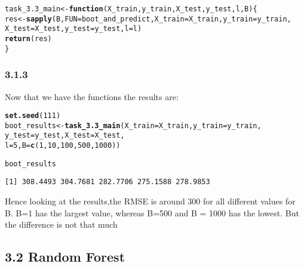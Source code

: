 \documentclass[10pt, a4paper, english]{article}\usepackage[]{graphicx}\usepackage[dvipsnames]{xcolor}
\makeatletter
\newcommand{\hlnum}[1]{\textcolor[rgb]{0.686,0.059,0.569}{#1}}%
\newcommand{\hlstd}[1]{\textcolor[rgb]{0.345,0.345,0.345}{#1}}%
\newcommand{\hlkwa}[1]{\textcolor[rgb]{0.161,0.373,0.58}{\textbf{#1}}}%
\newcommand{\hlkwb}[1]{\textcolor[rgb]{0.69,0.353,0.396}{#1}}%
\newcommand{\hlkwc}[1]{\textcolor[rgb]{0.333,0.667,0.333}{#1}}%
\newcommand{\hlkwd}[1]{\textcolor[rgb]{0.737,0.353,0.396}{\textbf{#1}}}%
\newenvironment{kframe}{%
 \def\at@end@of@kframe{}%
 \ifinner\ifhmode%
  \def\at@end@of@kframe{\end{minipage}}%
  \begin{minipage}{\columnwidth}%
 \fi\fi%
 \def\FrameCommand##1{\hskip\@totalleftmargin \hskip-\fboxsep
 \colorbox{shadecolor}{##1}\hskip-\fboxsep
     \hskip-\linewidth \hskip-\@totalleftmargin \hskip\columnwidth}%
 \MakeFramed {\advance\hsize-\width
   \@totalleftmargin\z@ \linewidth\hsize
   \@setminipage}}%
 {\par\unskip\endMakeFramed%
 \at@end@of@kframe}
\newenvironment{knitrout}{}{} %
\makeatother
\begin{document}
\begin{knitrout}
\begin{kframe}
\begin{alltt}
\hlstd{task_3.3_main} \hlkwb{<-} \hlkwa{function}\hlstd{(}\hlkwc{X_train}\hlstd{,} \hlkwc{y_train}\hlstd{,} \hlkwc{X_test}\hlstd{,} \hlkwc{y_test}\hlstd{,} \hlkwc{l}\hlstd{,} \hlkwc{B}\hlstd{)\{}
  \hlstd{res}\hlkwb{<-} \hlkwd{sapply}\hlstd{(B,} \hlkwc{FUN} \hlstd{= boot_and_predict,} \hlkwc{X_train}\hlstd{=X_train,} \hlkwc{y_train} \hlstd{= y_train,}
               \hlkwc{X_test} \hlstd{= X_test,} \hlkwc{y_test} \hlstd{= y_test,} \hlkwc{l}\hlstd{= l)}
  \hlkwd{return}\hlstd{(res)}
\hlstd{\}}
\end{alltt}
\end{kframe}
\end{knitrout}

\subsubsection{3.1.3}
Now that we have the functions  the results are: 
\begin{knitrout}
\color{fgcolor}\begin{kframe}
\begin{alltt}
\hlkwd{set.seed}\hlstd{(}\hlnum{111}\hlstd{)}
\hlstd{boot_results} \hlkwb{<-} \hlkwd{task_3.3_main}\hlstd{(}\hlkwc{X_train} \hlstd{= X_train,} \hlkwc{y_train} \hlstd{=  y_train,}
                              \hlkwc{y_test} \hlstd{= y_test,} \hlkwc{X_test} \hlstd{= X_test,}
              \hlkwc{l}\hlstd{=} \hlnum{5}\hlstd{,} \hlkwc{B}\hlstd{=} \hlkwd{c}\hlstd{(}\hlnum{1}\hlstd{,}\hlnum{10}\hlstd{,} \hlnum{100}\hlstd{,}\hlnum{500}\hlstd{,} \hlnum{1000}\hlstd{))}

\hlstd{boot_results}
\end{alltt}
\begin{verbatim}
[1] 308.4493 304.7681 282.7706 275.1588 278.9853
\end{verbatim}
\end{kframe}
\end{knitrout}
Hence looking at the results,the RMSE is around 300 for all different values for B. B=1 has the largest value, whereas B=500 and B = 1000 has the lowest. But the difference is not that much

\subsection{3.2 Random Forest}
\end{document}
